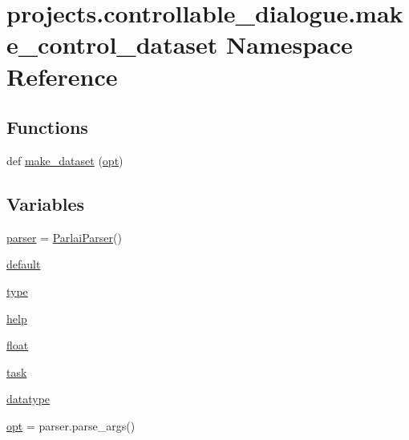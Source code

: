 \hypertarget{namespaceprojects_1_1controllable__dialogue_1_1make__control__dataset}{}\section{projects.\+controllable\+\_\+dialogue.\+make\+\_\+control\+\_\+dataset Namespace Reference}
\label{namespaceprojects_1_1controllable__dialogue_1_1make__control__dataset}
\subsection*{Functions}
\begin{DoxyCompactItemize}
\item 
def \hyperlink{namespaceprojects_1_1controllable__dialogue_1_1make__control__dataset_a8b209e575769f92c93ceb2c06e70fee1}{make\+\_\+dataset} (\hyperlink{namespaceprojects_1_1controllable__dialogue_1_1make__control__dataset_ab945d95ab130dd8f09fea9282bb7513d}{opt})
\end{DoxyCompactItemize}
\subsection*{Variables}
\begin{DoxyCompactItemize}
\item 
\hyperlink{namespaceprojects_1_1controllable__dialogue_1_1make__control__dataset_ad4b34cd0357d91d46706e2a2f86e001e}{parser} = \hyperlink{classparlai_1_1core_1_1params_1_1ParlaiParser}{Parlai\+Parser}()
\item 
\hyperlink{namespaceprojects_1_1controllable__dialogue_1_1make__control__dataset_a09f31a921073238daa379c3a4a9c238c}{default}
\item 
\hyperlink{namespaceprojects_1_1controllable__dialogue_1_1make__control__dataset_ac18f1b93e514ccda4429a60f66e78367}{type}
\item 
\hyperlink{namespaceprojects_1_1controllable__dialogue_1_1make__control__dataset_ac64271657fa93683a6004b8145b12050}{help}
\item 
\hyperlink{namespaceprojects_1_1controllable__dialogue_1_1make__control__dataset_aa2b7207688c641dbc094ab44eca27113}{float}
\item 
\hyperlink{namespaceprojects_1_1controllable__dialogue_1_1make__control__dataset_a0bead021e69d59fb4cdff2e7705f1f0e}{task}
\item 
\hyperlink{namespaceprojects_1_1controllable__dialogue_1_1make__control__dataset_ae6fa23d8106a608fbab7aae77d8bac39}{datatype}
\item 
\hyperlink{namespaceprojects_1_1controllable__dialogue_1_1make__control__dataset_ab945d95ab130dd8f09fea9282bb7513d}{opt} = parser.\+parse\+\_\+args()
\end{DoxyCompactItemize}


